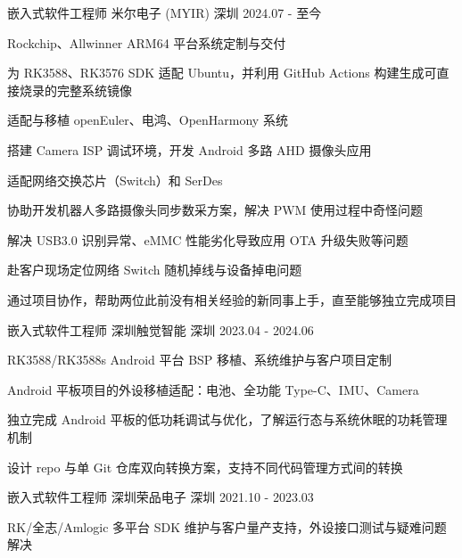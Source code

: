 \documentclass[11pt, a4paper]{awesome-cv}
\begin{document}
\begin{cventries}

\cventry
  {嵌入式软件工程师}
  {米尔电子 (MYIR)}
  {深圳}
  {2024.07 - 至今}
  {\begin{cvitems}
    \item Rockchip、Allwinner ARM64 平台系统定制与交付
    \item 为 RK3588、RK3576 SDK 适配 Ubuntu，并利用 GitHub Actions 构建生成可直接烧录的完整系统镜像
    \item 适配与移植 openEuler、电鸿、OpenHarmony 系统
    \item 搭建 Camera ISP 调试环境，开发 Android 多路 AHD 摄像头应用
    \item 适配网络交换芯片（Switch）和 SerDes
    \item 协助开发机器人多路摄像头同步数采方案，解决 PWM 使用过程中奇怪问题
    \item 解决 USB3.0 识别异常、eMMC 性能劣化导致应用 OTA 升级失败等问题
    \item 赴客户现场定位网络 Switch 随机掉线与设备掉电问题
    \item 通过项目协作，帮助两位此前没有相关经验的新同事上手，直至能够独立完成项目
  \end{cvitems}}

\vspace{-6mm}
\cventry
  {嵌入式软件工程师}
  {深圳触觉智能}
  {深圳}
  {2023.04 - 2024.06}
  {\begin{cvitems}
    \item RK3588/RK3588s Android 平台 BSP 移植、系统维护与客户项目定制
    \item Android 平板项目的外设移植适配：电池、全功能 Type-C、IMU、Camera
    \item 独立完成 Android 平板的低功耗调试与优化，了解运行态与系统休眠的功耗管理机制
    \item 设计 repo 与单 Git 仓库双向转换方案，支持不同代码管理方式间的转换
  \end{cvitems}}

\vspace{-6mm}
\cventry
  {嵌入式软件工程师}
  {深圳荣品电子}
  {深圳}
  {2021.10 - 2023.03}
  {\begin{cvitems}
    \item RK/全志/Amlogic 多平台 SDK 维护与客户量产支持，外设接口测试与疑难问题解决
  \end{cvitems}}


\end{cventries}
\vspace{-6mm}
\end{document}

